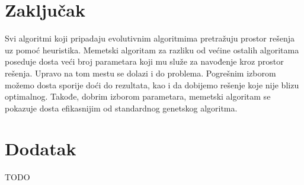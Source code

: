 \documentclass[a4paper]{article}
\begin{document}
\section{Zaključak}
\label{sec:zakljucak}

Svi algoritmi koji pripadaju evolutivnim algoritmima pretražuju prostor rešenja uz pomoć heuristika. Memetski algoritam za razliku od većine ostalih algoritama poseduje dosta veći broj parametara koji mu služe za navođenje kroz prostor rešenja. Upravo na tom mestu se dolazi i do problema. Pogrešnim izborom možemo dosta sporije doći do rezultata, kao i da dobijemo rešenje koje nije blizu optimalnog. Takođe, dobrim izborom parametara, memetski algoritam se pokazuje dosta efikasnijim od standardnog genetskog algoritma.

\appendix
 


\appendix
\section{Dodatak}
TODO
\end{document}
